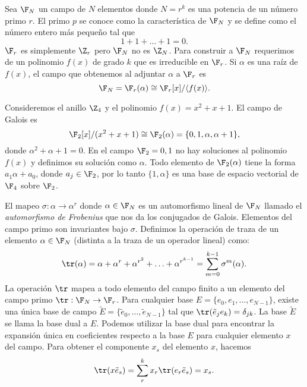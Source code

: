   Sea $\F_N$ un campo de $N$ elementos donde $N = r^{k}$ es
  una potencia de un número primo $r$. El primo $p$ se
  conoce como la característica de $\F_N$ y se define como
  el número entero más pequeño tal que
  \[
    1 + 1 + \ldots + 1 = 0.
  \] 
  $\F_r$ es simplemente $\Z_r$ pero $\F_N$ no es $\Z_N$.
  Para construir a $\F_N$ requerimos de un polinomio $f(x)$ 
  de grado $k$ que es irreducible en $\F_r$. Si $\alpha$ es
  una raíz de $f(x)$, el campo que obtenemos al adjuntar
  $\alpha$ a $\F_r$ es
  \[
    \F_N
    = \F_r(\alpha) \cong \F_r[x] / \langle f(x) \rangle.
  \] 
  \begin{example}
    Consideremos el anillo $\Z_4$ y el polinomio $f(x) = x^2
    + x + 1$. El campo de Galois es
    \[
      \F_2[x] / (x^2 + x + 1)
      \cong \F_2(\alpha)
      = \{0, 1, \alpha, \alpha + 1\},
    \] 
    donde $\alpha^2 + \alpha + 1 = 0$. En el campo $\F_2 =
    {0,1}$ no hay soluciones al polinomio $f(x)$ y definimos
    su solución como $\alpha$. Todo elemento de
    $\F_2(\alpha)$ tiene la forma $a_1 \alpha + a_0$, donde
    $a_j \in \F_2$, por lo tanto $\{1, \alpha\}$ es una base
    de espacio vectorial de $\F_4$ sobre $\F_2$.
  \end{example}

  El mapeo $\sigma : \alpha \to \alpha^r$ donde $\alpha \in
  \F_N$ es un automorfismo lineal de $\F_N$ llamado el
  \textit{automorfismo de Frobenius} que nos da los
  conjugados de Galois. Elementos del campo primo son
  invariantes bajo $\sigma$. Definimos la operación de traza
  de un elemento $\alpha \in \F_N$ (distinta a la traza de
  un operador lineal) como:
  \[
    \tr(\alpha) 
    = \alpha + \alpha^{r} + \alpha^{r^2} + \ldots +
    \alpha^{r^{k-1}}
    = \sum_{m=0}^{k-1} \sigma^{m}(\alpha).
  \] 
  La operación $\tr$ mapea a todo elemento del campo finito
  a un elemento del campo primo $\tr : \F_N \to \F_r$. Para
  cualquier base $E = \{e_0,e_1,\ldots,e_{N-1}\}$, existe
  una única base de campo $\tilde E = \{\tilde
  e_0,\ldots,\tilde e_{N-1}\}$ tal que $\tr(\tilde e_j e_k)
  = \delta_{jk}$. La base $\tilde E$ se llama la base dual a
  $E$. Podemos utilizar la base dual para encontrar la
  expansión única en coeficientes respecto a la base $E$ 
  para cualquier elemento $x$ del campo. Para obtener el
  componente $x_s$ del elemento $x$, hacemos
  \[
    \tr(x \tilde e_s)
    = \sum_{r}^{k} x_r \tr(e_r \tilde e_s)
    = x_s.
  \]

